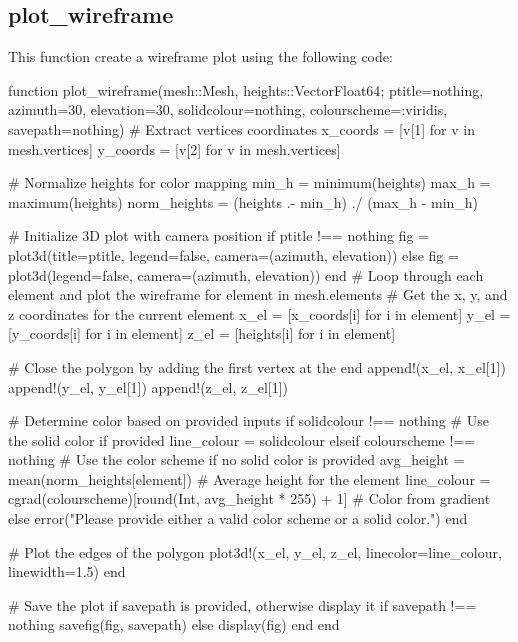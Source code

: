 \documentclass{report}
\begin{document}
\subsection{plot\_wireframe}

This function create a wireframe plot using the following code:
\begin{jllisting}[style=JuliaStyle]
function plot_wireframe(mesh::Mesh, heights::Vector{Float64}; ptitle=nothing, azimuth=30, elevation=30, solidcolour=nothing, colourscheme=:viridis, savepath=nothing)
    # Extract vertices coordinates
    x_coords = [v[1] for v in mesh.vertices]
    y_coords = [v[2] for v in mesh.vertices]

    # Normalize heights for color mapping
    min_h = minimum(heights)
    max_h = maximum(heights)
    norm_heights = (heights .- min_h) ./ (max_h - min_h)

    # Initialize 3D plot with camera position
    if ptitle !== nothing
        fig = plot3d(title=ptitle, legend=false, camera=(azimuth, elevation))
    else
        fig = plot3d(legend=false, camera=(azimuth, elevation))
    end
    # Loop through each element and plot the wireframe
    for element in mesh.elements
        # Get the x, y, and z coordinates for the current element
        x_el = [x_coords[i] for i in element]
        y_el = [y_coords[i] for i in element]
        z_el = [heights[i] for i in element]

        # Close the polygon by adding the first vertex at the end
        append!(x_el, x_el[1])
        append!(y_el, y_el[1])
        append!(z_el, z_el[1])

        # Determine color based on provided inputs
        if solidcolour !== nothing
            # Use the solid color if provided
            line_colour = solidcolour
        elseif colourscheme !== nothing
            # Use the color scheme if no solid color is provided
            avg_height = mean(norm_heights[element])  # Average height for the element
            line_colour = cgrad(colourscheme)[round(Int, avg_height * 255) + 1]  # Color from gradient
        else
            error("Please provide either a valid color scheme or a solid color.")
        end

        # Plot the edges of the polygon
        plot3d!(x_el, y_el, z_el, linecolor=line_colour, linewidth=1.5)
    end

    # Save the plot if savepath is provided, otherwise display it
    if savepath !== nothing
        savefig(fig, savepath)
    else
        display(fig)
    end
end
\end{jllisting}
\end{document}
